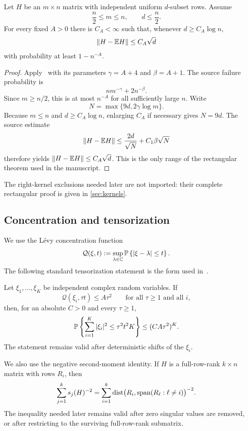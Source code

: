 \begin{proposition}\label{prop:restricted-norm}
Let $H$ be an $m\times n$ matrix with independent uniform $d$-subset rows. Assume
\[
  \frac n2\le m\le n,
  \qquad
  d\le\frac n2.
\]
For every fixed $A>0$ there is $C_A<\infty$ such that, whenever $d\ge C_A\log n$,
\[
  \left\|H-\mathbb E H\right\|\le C_A\sqrt d
\]
with probability at least $1-n^{-A}$.
\end{proposition}

\begin{proof}
Apply~\cite[Theorem~4.1]{LLY26a} with its parameters $\gamma=A+4$ and $\beta=A+1$. The source failure probability is
\[
  nm^{-\gamma}+2n^{-\beta}.
\]
Since $m\ge n/2$, this is at most $n^{-A}$ for all sufficiently large $n$. Write
\[
  N=\max\{9d,2\gamma\log m\}.
\]
Because $m\le n$ and $d\ge C_A\log n$, enlarging $C_A$ if necessary gives $N=9d$. The source estimate
\[
  \left\|H-\mathbb E H\right\|
  \le \frac{2d}{\sqrt N}+C_1\beta\sqrt N
\]
therefore yields $\left\|H-\mathbb E H\right\|\le C_A\sqrt d$. This is the only range of the rectangular theorem used in the manuscript.
\end{proof}

The right-kernel exclusions needed later are not imported: their complete rectangular proof is given in \cref{sec:kernels}.

\subsection{Concentration and tensorization}

We use the L\'evy concentration function
\[
  \mathcal Q(\xi,t):=\sup_{\lambda\in\mathbb C}\mathbb P\left\{|\xi-\lambda|\le t\right\}.
\]
The following standard tensorization statement is the form used in~\cite[Lemma~2.7]{LLTTY19}.

\begin{lemma}[Tensorization]\label{lem:tensorization}
Let $\xi_1,\ldots,\xi_K$ be independent complex random variables. If
\[
  \mathcal Q(\xi_i,\tau t)\le A\tau^2
  \qquad\text{for all }\tau\ge1\text{ and all }i,
\]
then, for an absolute $C>0$ and every $\tau\ge1$,
\[
  \mathbb P\left\{\sum_{i=1}^K|\xi_i|^2\le\tau^2t^2K\right\}
  \le(CA\tau^2)^K.
\]
The statement remains valid after deterministic shifts of the $\xi_i$.
\end{lemma}

We also use the negative second-moment identity. If $H$ is a full-row-rank $k\times n$ matrix with rows $R_i$, then
\begin{equation}\label{eq:negative-second-moment}
  \sum_{j=1}^k s_j(H)^{-2}
  =\sum_{i=1}^k\operatorname{dist}\bigl(R_i,\operatorname{span}(R_\ell:\ell\ne i)\bigr)^{-2}.
\end{equation}
The inequality needed later remains valid after zero singular values are removed, or after restricting to the surviving full-row-rank submatrix.
